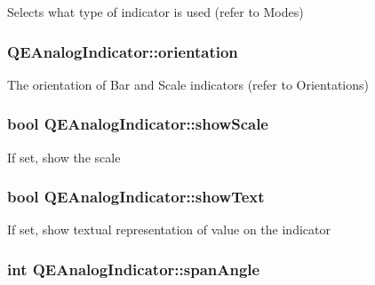 \label{classQEAnalogIndicator_acfe714eddf4dbffca49c3719e006027d}
Selects what type of indicator is used (refer to Modes) \hypertarget{classQEAnalogIndicator_a86620e24243bd0ef449e07bdb6778720}{
\subsubsection[{orientation}]{ QEAnalogIndicator::orientation}}
\label{classQEAnalogIndicator_a86620e24243bd0ef449e07bdb6778720}
The orientation of Bar and Scale indicators (refer to Orientations) \hypertarget{classQEAnalogIndicator_a5566b124bcc23b20c784490ebb5e0095}{
\subsubsection[{showScale}]{\setlength{\rightskip}{0pt plus 5cm}bool QEAnalogIndicator::showScale}}
\label{classQEAnalogIndicator_a5566b124bcc23b20c784490ebb5e0095}
If set, show the scale \hypertarget{classQEAnalogIndicator_af21560a34b89683bbf1d86733522a684}{
\subsubsection[{showText}]{\setlength{\rightskip}{0pt plus 5cm}bool QEAnalogIndicator::showText}}
\label{classQEAnalogIndicator_af21560a34b89683bbf1d86733522a684}
If set, show textual representation of value on the indicator \hypertarget{classQEAnalogIndicator_a729a2313bdac9b7d6d49ecd4158d0aea}{
\subsubsection[{spanAngle}]{\setlength{\rightskip}{0pt plus 5cm}int QEAnalogIndicator::spanAngle}}
